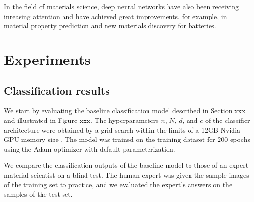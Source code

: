 \documentclass[10pt,twocolumn,letterpaper]{article}
\begin{document}
In the field of materials science, deep neural networks have also been receiving inreasing attention and have achieved great improvements, for example, in material property prediction and new materials discovery for batteries.

\section{Experiments}

\subsection{Classification results}
We start by evaluating the baseline classification model described in Section xxx and illustrated in Figure xxx.
The hyperparameters $n$, $N$, $d$, and $c$ of the classifier architecture 
were obtained by a grid search within the limits of a 12GB Nvidia GPU memory size .
The model was trained on the training dataset for 200 epochs using the Adam optimizer with default parameterization.

We compare the classification outputs of the baseline model to those 
of an expert material scientist on a blind test.
The human expert was given the sample images of the training set to practice,
and we evaluated the expert's answers on the samples of the test set.
\end{document}
